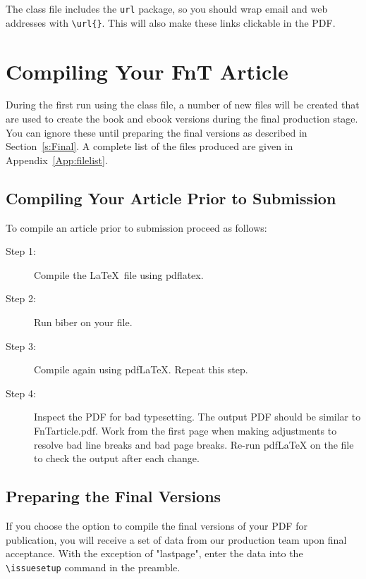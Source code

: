 \documentclass[examplefnt,biber]{nowfnt} %
\begin{document}
The class file includes the \texttt{url} package, so you should wrap
email and web addresses with \texttt{\textbackslash url\{\}}. This will
also make these links clickable in the PDF. 


\chapter{Compiling Your FnT Article}
During the first run using the class file, a number of new files will be created
that are used to create the book and ebook versions during the final
production stage. You can ignore these until preparing the final versions
as described in Section~\ref{s:Final}. A complete list of the files produced
are given in Appendix~\ref{App:filelist}.

\section{Compiling Your Article Prior to Submission}
To compile an article prior to submission proceed as follows:
\begin{description}
\item [Step 1:] Compile the \LaTeX\ file using pdflatex.
\item [Step 2:] Run biber on your file.
\item [Step 3:] Compile again using pdfLaTeX. Repeat this step.
\item [Step 4:] Inspect the PDF for bad typesetting. The output PDF should be similar to FnTarticle.pdf. Work from the first page when making adjustments to resolve bad line breaks and bad page breaks. Re-run pdfLaTeX on the file to check the output after each change.
\end{description}

\section{Preparing the Final Versions}

If you choose the option to compile the final versions of your PDF for publication,
 you will receive a set of data from our production team upon final acceptance. 
With the exception of  "lastpage", enter the data into the \verb+\issuesetup+ command in the preamble.   
\end{document}
